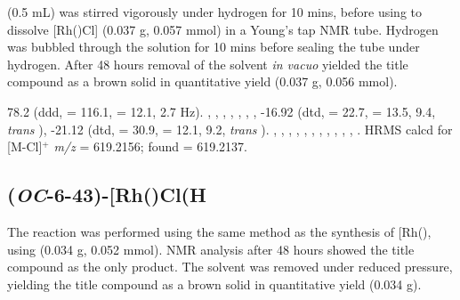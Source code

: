 
 (0.5 mL) was stirred vigorously under hydrogen for 10 mins, before using to dissolve [Rh(\tBusixantphos)Cl] (0.037 g, 0.057 mmol) in a Young's tap NMR tube.  Hydrogen was bubbled through the solution for 10 mins before sealing the tube under hydrogen.  After 48 hours removal of the solvent \emph{in vacuo} yielded the title compound as a brown solid in quantitative yield (0.037 g, 0.056 mmol).  

78.2 (ddd, \JRhP{} = 116.1, \JPH{} = 12.1, 2.7 Hz).
,
,
,
,
,
,
,
-16.92 (dtd, \JRhH{} = 22.7, \JPH{} = 13.5, \JHH{} 9.4,  \emph{trans} ),
-21.12 (dtd, \JRhH{} = 30.9, \JPH{} = 12.1, \JHH{} 9.2,  \emph{trans} ).
,
,
,
,
,
,
,
,
,
,
,
.
HRMS calcd for  [M-Cl]$^+$ \emph{m/z} = 619.2156; found = 619.2137.


\subsection*{(\emph{OC}-6-43)-\texorpdfstring{[Rh(\tButhixantphosk)Cl(H\ce{)2]}} R}


The reaction was performed using the same method as the synthesis of [Rh(\tBusixantphos)\ce{Cl(H)2]}, using \tButhixantphos{} (0.034 g, 0.052 mmol).  NMR analysis after 48 hours showed the title compound as the only product.  The solvent was removed under reduced pressure, yielding the title compound as a brown solid in quantitative yield (0.034 g).  

